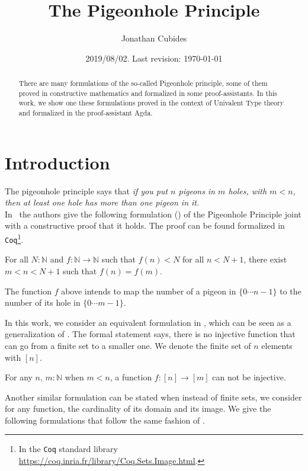 \documentclass[11pt, a4paper, oneside]{amsart}
\title{The Pigeonhole Principle}
\date{2019/08/02. Last revision: \today}
\author{Jonathan Cubides}
\begin{document}
\maketitle

\begin{abstract}
There are many formulations of the so-called Pigeonhole principle,
some of them proved in constructive mathematics and formalized in some
proof-assistants. In this work, we show one these formulations proved
in the context of Univalent Type theory and formalized in the
proof-assistant Agda.
\end{abstract}

\section{Introduction}

The pigeonhole principle says that \emph{if you put $n$ pigeons in $m$
holes, with $m < n$, then at least one hole has more than one pigeon
in it.}\\

In~\cite{symmetrybook} the authors give the following formulation
() of the Pigeonhole Principle joint with a constructive
proof that it holds. The proof can be found formalized in
\texttt{Coq}\footnote{In the \texttt{Coq} standard library
\url{https://coq.inria.fr/library/Coq.Sets.Image.html}.}.

\begin{theorem}\label{lem:PHP}
For all $N:ℕ$ and $f:ℕ\to ℕ$ such that $f(n)<N$ for all $n<N+1$, there
exist $m < n < N+1$ such that $f(n)=f(m)$.
\end{theorem}

The function $f$ above intends to map the number of a pigeon in
$\{0\cdots n−1\}$ to the number of its hole in $\{0\cdots m−1\}$.

In this work, we consider an equivalent formulation in
, which can be seen as a generalization of
. The formal statement says, there is no injective
function that can go from a finite set to a smaller one. We denote the
finite set of $n$ elements with $[n]$.

\begin{theorem}\label{pigeon-theorem} For any
$n,\, m : ℕ$ when $m < n$,  a function $f : [ n ] \to [ m ]$ can not
be injective.
\end{theorem}

Another similar formulation can be stated when instead of finite sets,
we consider for any function, the cardinality of its domain and its
image. We give the following formulations that follow the same fashion
of .
\end{document}
